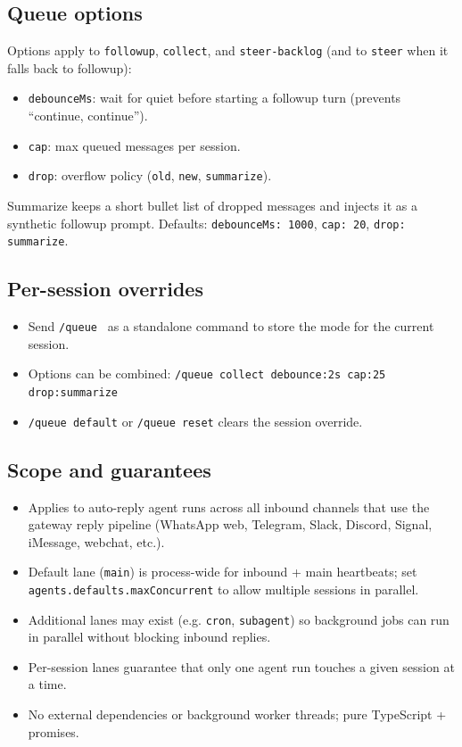 \subsection{Queue options}


Options apply to \texttt{followup}, \texttt{collect}, and \texttt{steer-backlog} (and to \texttt{steer} when it falls back to followup):

\begin{itemize}
  \item \texttt{debounceMs}: wait for quiet before starting a followup turn (prevents “continue, continue”).
  \item \texttt{cap}: max queued messages per session.
  \item \texttt{drop}: overflow policy (\texttt{old}, \texttt{new}, \texttt{summarize}).
\end{itemize}


Summarize keeps a short bullet list of dropped messages and injects it as a synthetic followup prompt.
Defaults: \texttt{debounceMs: 1000}, \texttt{cap: 20}, \texttt{drop: summarize}.

\subsection{Per-session overrides}


\begin{itemize}
  \item Send \texttt{/queue } as a standalone command to store the mode for the current session.
  \item Options can be combined: \texttt{/queue collect debounce:2s cap:25 drop:summarize}
  \item \texttt{/queue default} or \texttt{/queue reset} clears the session override.
\end{itemize}


\subsection{Scope and guarantees}


\begin{itemize}
  \item Applies to auto-reply agent runs across all inbound channels that use the gateway reply pipeline (WhatsApp web, Telegram, Slack, Discord, Signal, iMessage, webchat, etc.).
  \item Default lane (\texttt{main}) is process-wide for inbound + main heartbeats; set \texttt{agents.defaults.maxConcurrent} to allow multiple sessions in parallel.
  \item Additional lanes may exist (e.g. \texttt{cron}, \texttt{subagent}) so background jobs can run in parallel without blocking inbound replies.
  \item Per-session lanes guarantee that only one agent run touches a given session at a time.
  \item No external dependencies or background worker threads; pure TypeScript + promises.
\end{itemize}


